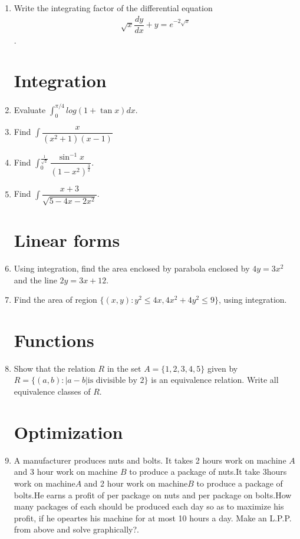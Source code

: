 \documentclass[10pt,-letter paper]{article}
\providecommand{\brak}[1]{\ensuremath{\left(#1\right)}}
\begin{document}
\begin{enumerate}
\item Write the integrating factor of the differential equation 
\begin{align}
\sqrt{x}\dfrac{dy}{dx}+y = e^{-2\sqrt{x}}
\end{align}.\\


\section{Integration}

\item Evaluate $\int_{0}^{\pi/4} log\brak{1+ \tan{x}}dx$.\\

\item Find $\int \dfrac{x}{\brak{x^{2}+1}\brak{x-1}}$

\item Find $\int_0^{\frac{1}{\sqrt{2}}} \dfrac{\sin^{-1}{x}}{\brak{1-x^{2}}^{\frac{3}{2}}}$.\\

\item Find $\int \dfrac{x+3}{\sqrt{5-4x-2x^2}}$.\\

\section{Linear forms}

\item Using integration, find the area enclosed by parabola enclosed by $4y = 3x^2$ and the line $2y=3x+12$.

\item Find the area of region $\{ \brak{x,y} : y^2 \leq 4x , 4x^2 +4y^2 \leq 9 \}$, using integration.\\
\section{Functions}


\item Show that the relation $R$ in the set $A = \{1,2,3,4,5 \}$ given by $R =\{(a,b):|a-b| \text{is divisible by 2}\}$ is an equivalence relation. Write all equivalence classes of $R$.\\ 
\section{Optimization}

\item A manufacturer produces nuts and bolts. It takes 2 hours work on machine $A$ and 3 hour work on machine $B$ to produce a package of nuts.It take 3hours work on machine$A$ and 2 hour work on machine$B$ to produce a package of bolts.He earns a profit of  per package on nuts and  per package on bolts.How many packages of each should be produced each day so as to maximize his profit, if he opeartes his machine for at most 10 hours a day. Make an L.P.P. from above and solve graphically?.\\


\end{enumerate}
\end{document}

